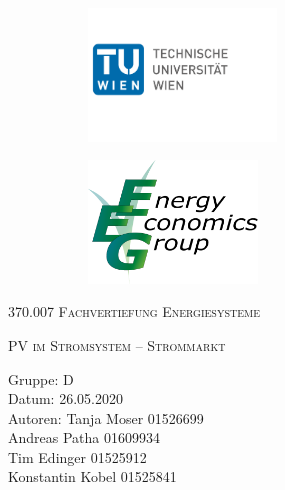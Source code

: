 \documentclass[a4paper,12pt]{article}
\begin{document}
	\begin{titlepage}
		\begin{figure}[h]
			\begin{subfigure}{1cm}
				\includegraphics[width=5cm]{img/TU_Logo}
			\end{subfigure}
			\hspace{10cm}
			\begin{subfigure}{6cm}
				\includegraphics[width=4.5cm]{img/EEG_logo}
			\end{subfigure}
		\end{figure}
		\centering
		\bigskip \bigskip \bigskip \bigskip \bigskip
		\scshape\LARGE 370.007 Fachvertiefung Energiesysteme\par
		\vspace{1cm}
		\scshape\Large PV im Stromsystem – Strommarkt \par
		\vspace{8cm}
		\raggedright
		\large Gruppe: D \\
		Datum: 26.05.2020 \\
		Autoren: Tanja Moser 01526699\\
		\hspace{2.4cm} Andreas Patha 01609934\\
		\hspace{2.4cm} Tim Edinger 01525912\\
		\hspace{2.4cm} Konstantin Kobel 01525841\\
		\vfill
		\large \par
	\end{titlepage}
\end{document}
